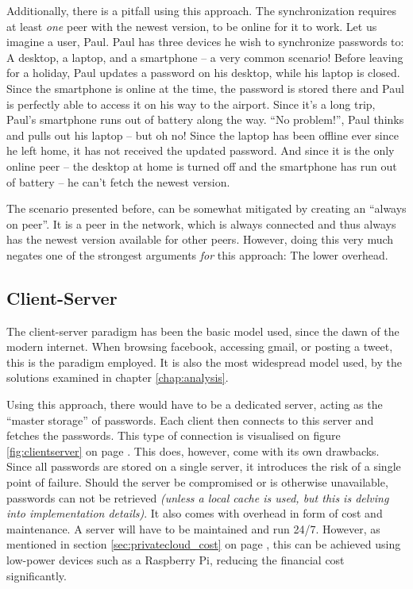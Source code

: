 			Additionally, there is a pitfall using this approach. The synchronization requires at least \emph{one} peer with the newest version, to be online for it to work. Let us imagine a user, Paul. Paul has three devices he wish to synchronize passwords to: A desktop, a laptop, and a smartphone -- a very common scenario! Before leaving for a holiday, Paul updates a password on his desktop, while his laptop is closed. Since the smartphone is online at the time, the password is stored there and Paul is perfectly able to access it on his way to the airport. Since it's a long trip, Paul's smartphone runs out of battery along the way. ``No problem!'', Paul thinks and pulls out his laptop -- but oh no! Since the laptop has been offline ever since he left home, it has not received the updated password. And since it is the only online peer -- the desktop at home is turned off and the smartphone has run out of battery -- he can't fetch the newest version. 

			The scenario presented before, can be somewhat mitigated by creating an ``always on peer''. It is a peer in the network, which is always connected and thus always has the newest version available for other peers. However, doing this very much negates one of the strongest arguments \emph{for} this approach: The lower overhead.

		\subsection{Client-Server}
			The client-server paradigm has been the basic model used, since the dawn of the modern internet. When browsing facebook, accessing gmail, or posting a tweet, this is the paradigm employed. It is also the most widespread model used, by the solutions examined in chapter \ref{chap:analysis}.

			Using this approach, there would have to be a dedicated server, acting as the ``master storage'' of passwords. Each client then connects to this server and fetches the passwords. This type of connection is visualised on figure \ref{fig:clientserver} on page \pageref{fig:clientserver}. This does, however, come with its own drawbacks. Since all passwords are stored on a single server, it introduces the risk of a single point of failure. Should the server be compromised or is otherwise unavailable, passwords can not be retrieved \emph{(unless a local cache is used, but this is delving into implementation details)}. It also comes with overhead in form of cost and maintenance. A server will have to be maintained and run 24/7. However, as mentioned in section \ref{sec:privatecloud_cost} on page \pageref{sec:privatecloud_cost}, this can be achieved using low-power devices such as a Raspberry Pi, reducing the financial cost significantly.

